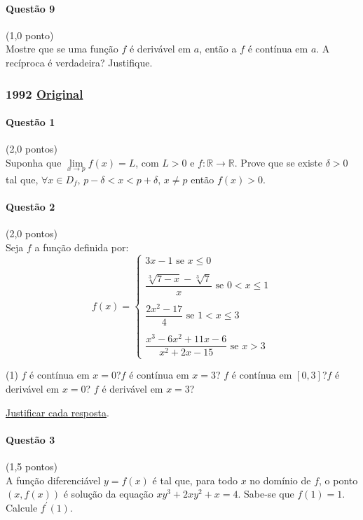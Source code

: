 \documentclass[12pt,a4paper]{article}
\newcommand{\R}{\mathbb{R}}
\newcommand{\original}[1]{\tiny \href{#1}{Original} \normalsize}
\begin{document}
\paragraph{Questão 9} (1,0 ponto)\\
Mostre que se uma função $f$ é derivável em $a$, então a $f$ é contínua em $a$. A recíproca é verdadeira? Justifique.

\newpage

\subsubsection{1992 \original{https://drive.google.com/open?id=1fhdKNLt2nU57LRMyrsUmHaRHOpavO-rI}}

\paragraph{Questão 1} (2,0 pontos)\\
Suponha que $\lim\limits_{x\to p} f(x) = L$, com $L>0$ e $f: \R \to \R$. Prove que se existe $\delta >0$ tal que, $\forall x \in D_f,\, p-\delta < x < p+\delta, \, x\neq p$ então $f(x) > 0$.

\paragraph{Questão 2} (2,0 pontos)\\
Seja $f$ a função definida por:$$f(x) = \begin{cases}3x-1 \text{ se } x\le 0 \\ \\ \dfrac{\sqrt[3]{7-x} - \sqrt[3]{7}}{x} \text{ se } 0<x\le 1\\ \\ \dfrac{2x^2-17}{4} \text{ se }1<x\le 3 \\ \\ \dfrac{x^3-6x^2 + 11x - 6}{x^2 + 2x - 15} \text{ se }x>3\end{cases}$$\begin{tasks}(1)
\task $f$ é contínua em $x=0$?\newline $f$ é contínua em $x=3$?
\task $f$ é contínua em $[0,3]$?\newline $f$ é derivável em $x=0$? \newline $f$ é derivável em $x=3$?
\end{tasks}
\underline{Justificar cada resposta}.

\paragraph{Questão 3} (1,5 pontos)\\
A função diferenciável $y=f(x)$ é tal que, para todo $x$ no domínio de $f$, o ponto $\left(x, f(x)\right)$ é solução da equação $xy^3 + 2xy^2 + x = 4$. Sabe-se que $f(1) = 1$. Calcule $f^{\prime}(1)$.
\end{document}
